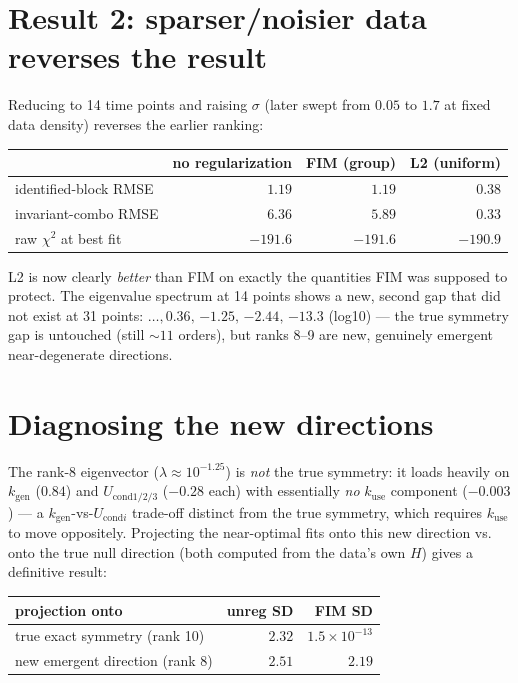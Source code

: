 \documentclass[11pt]{article}
\begin{document}
\section{Result 2: sparser/noisier data reverses the result}
\label{sec:sweep}

Reducing to 14 time points and raising $\sigma$ (later swept from $0.05$ to
$1.7$ at fixed data density) reverses the earlier ranking:

\begin{center}
\begin{tabular}{lrrr}
\toprule
 & no regularization & FIM (group) & L2 (uniform) \\
\midrule
identified-block RMSE & $1.19$ & $1.19$ & $0.38$ \\
invariant-combo RMSE & $6.36$ & $5.89$ & $0.33$ \\
raw $\chi^2$ at best fit & $-191.6$ & $-191.6$ & $-190.9$ \\
\bottomrule
\end{tabular}
\end{center}

L2 is now clearly \emph{better} than FIM on exactly the quantities FIM was
supposed to protect. The eigenvalue spectrum at 14 points shows a new,
second gap that did not exist at 31 points: $\ldots,0.36,\,{-1.25},\,{-2.44},
\,{-13.3}$ (log10) --- the true symmetry gap is untouched (still
$\sim\!11$ orders), but ranks 8--9 are new, genuinely emergent near-degenerate
directions.

\section{Diagnosing the new directions}
\label{sec:eigendecomp}

The rank-8 eigenvector ($\lambda\approx 10^{-1.25}$) is \emph{not} the true
symmetry: it loads heavily on $k_{\text{gen}}$ ($0.84$) and
$U_{\text{cond1/2/3}}$ ($-0.28$ each) with essentially \emph{no}
$k_{\text{use}}$ component ($-0.003$) --- a $k_{\text{gen}}$-vs-$U_{\text{cond}i}$
trade-off distinct from the true symmetry, which requires $k_{\text{use}}$ to
move oppositely. Projecting the near-optimal fits onto this new direction
vs. onto the true null direction (both computed from the data's own $H$)
gives a definitive result:

\begin{center}
\begin{tabular}{lrr}
\toprule
projection onto & unreg SD & FIM SD \\
\midrule
true exact symmetry (rank 10) & $2.32$ & $1.5\times 10^{-13}$ \\
new emergent direction (rank 8) & $2.51$ & $2.19$ \\
\bottomrule
\end{tabular}
\end{center}
\end{document}
